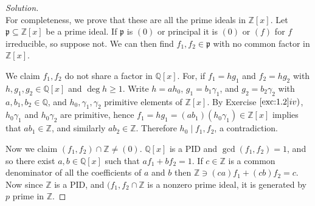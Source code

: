 \documentclass[12pt,letterpaper]{article}
\theoremstyle{definition}
\theoremstyle{remark}
\numberwithin{figure}{problem}
\numberwithin{equation}{section}
\begin{document}
\begin{proof}[Solution]
\begin{equation*}
  \end{equation*}
  For completeness, we prove that these are all the prime ideals in $\mathbb{Z}[x]$. Let $\mathfrak{p} \subseteq \mathbb{Z}[x]$ be a prime ideal. If $\mathfrak{p}$ is $(0)$ or principal it is $(0)$ or $(f)$ for $f$ irreducible, so suppose not. We can then find $f_1,f_2 \in \mathfrak{p}$ with no common factor in $\mathbb{Z}[x]$.
  \par We claim $f_1,f_2$ do not share a factor in $\mathbb{Q}[x]$. For, if $f_1 = hg_1$ and $f_2 = hg_2$ with $h,g_1,g_2 \in \mathbb{Q}[x]$ and $\deg h \ge 1$. Write $h = ah_0$, $g_1 = b_1\gamma_1$, and $g_2 = b_2\gamma_2$ with $a,b_1,b_2 \in \mathbb{Q}$, and $h_0,\gamma_1,\gamma_2$ primitive elements of $\mathbb{Z}[x]$. By Exercise $\ref{exc:1.2}iv)$, $h_0\gamma_1$ and $h_0\gamma_2$ are primitive, hence $f_1 = hg_1 = (ab_1)(h_0\gamma_1) \in \mathbb{Z}[x]$ implies that $ab_1 \in \mathbb{Z}$, and similarly $ab_2 \in \mathbb{Z}$. Therefore $h_0 \mid f_1,f_2$, a contradiction.
  \par Now we claim $(f_1,f_2) \cap \mathbb{Z} \ne (0)$. $\mathbb{Q}[x]$ is a PID and $\gcd(f_1,f_2) = 1$, and so there exist $a,b \in \mathbb{Q}[x]$ such that $af_1 + bf_2 = 1$. If $c \in \mathbb{Z}$ is a common denominator of all the coefficients of $a$ and $b$ then $\mathbb{Z} \ni (ca)f_1 + (cb)f_2 = c$. Now since $\mathbb{Z}$ is a PID, and $(f_1,f_2 \cap \mathbb{Z}$ is a nonzero prime ideal, it is generated by $p$ prime in $\mathbb{Z}$.
\end{proof}
\end{document}
